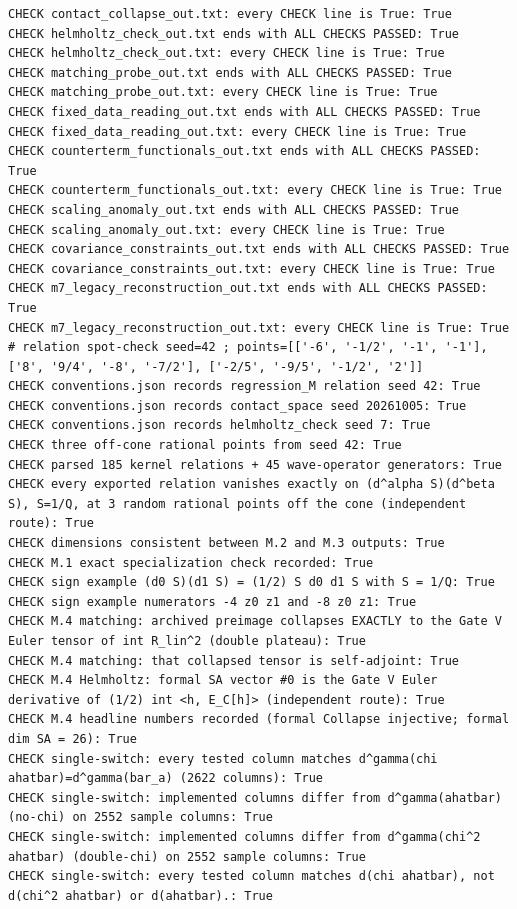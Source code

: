 \documentclass{article}
\theoremstyle{remark}
\begin{document}
\begin{lstlisting}
CHECK contact_collapse_out.txt: every CHECK line is True: True
CHECK helmholtz_check_out.txt ends with ALL CHECKS PASSED: True
CHECK helmholtz_check_out.txt: every CHECK line is True: True
CHECK matching_probe_out.txt ends with ALL CHECKS PASSED: True
CHECK matching_probe_out.txt: every CHECK line is True: True
CHECK fixed_data_reading_out.txt ends with ALL CHECKS PASSED: True
CHECK fixed_data_reading_out.txt: every CHECK line is True: True
CHECK counterterm_functionals_out.txt ends with ALL CHECKS PASSED: True
CHECK counterterm_functionals_out.txt: every CHECK line is True: True
CHECK scaling_anomaly_out.txt ends with ALL CHECKS PASSED: True
CHECK scaling_anomaly_out.txt: every CHECK line is True: True
CHECK covariance_constraints_out.txt ends with ALL CHECKS PASSED: True
CHECK covariance_constraints_out.txt: every CHECK line is True: True
CHECK m7_legacy_reconstruction_out.txt ends with ALL CHECKS PASSED: True
CHECK m7_legacy_reconstruction_out.txt: every CHECK line is True: True
# relation spot-check seed=42 ; points=[['-6', '-1/2', '-1', '-1'], ['8', '9/4', '-8', '-7/2'], ['-2/5', '-9/5', '-1/2', '2']]
CHECK conventions.json records regression_M relation seed 42: True
CHECK conventions.json records contact_space seed 20261005: True
CHECK conventions.json records helmholtz_check seed 7: True
CHECK three off-cone rational points from seed 42: True
CHECK parsed 185 kernel relations + 45 wave-operator generators: True
CHECK every exported relation vanishes exactly on (d^alpha S)(d^beta S), S=1/Q, at 3 random rational points off the cone (independent route): True
CHECK dimensions consistent between M.2 and M.3 outputs: True
CHECK M.1 exact specialization check recorded: True
CHECK sign example (d0 S)(d1 S) = (1/2) S d0 d1 S with S = 1/Q: True
CHECK sign example numerators -4 z0 z1 and -8 z0 z1: True
CHECK M.4 matching: archived preimage collapses EXACTLY to the Gate V Euler tensor of int R_lin^2 (double plateau): True
CHECK M.4 matching: that collapsed tensor is self-adjoint: True
CHECK M.4 Helmholtz: formal SA vector #0 is the Gate V Euler derivative of (1/2) int <h, E_C[h]> (independent route): True
CHECK M.4 headline numbers recorded (formal Collapse injective; formal dim SA = 26): True
CHECK single-switch: every tested column matches d^gamma(chi ahatbar)=d^gamma(bar_a) (2622 columns): True
CHECK single-switch: implemented columns differ from d^gamma(ahatbar) (no-chi) on 2552 sample columns: True
CHECK single-switch: implemented columns differ from d^gamma(chi^2 ahatbar) (double-chi) on 2552 sample columns: True
CHECK single-switch: every tested column matches d(chi ahatbar), not d(chi^2 ahatbar) or d(ahatbar).: True

\end{lstlisting}
\end{document}
